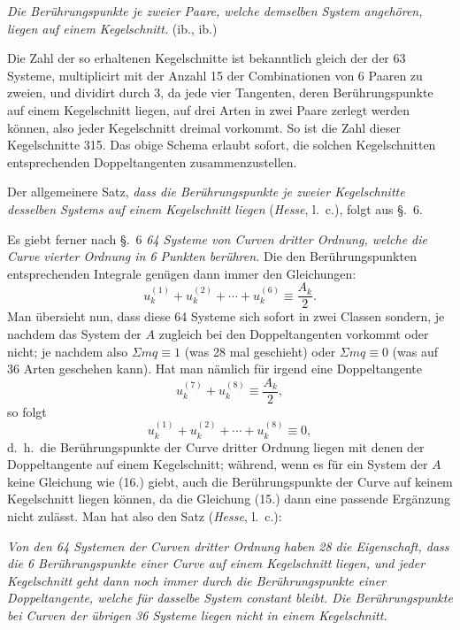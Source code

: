 \documentclass{article}
\begin{document}

\emph{Die Berührungspunkte je zweier Paare, welche demselben System angehören, liegen auf einem Kegelschnitt.} (ib., ib.)

Die Zahl der so erhaltenen Kegelschnitte ist bekanntlich gleich der der 63 Systeme, multiplicirt mit der Anzahl 15 der Combinationen von 6 Paaren zu zweien, und dividirt durch 3, da jede vier Tangenten, deren Berührungspunkte auf einem Kegelschnitt liegen, auf drei Arten in zwei Paare zerlegt werden können, also jeder Kegelschnitt dreimal vorkommt. So ist die Zahl dieser Kegelschnitte 315. Das obige Schema erlaubt sofort, die solchen Kegelschnitten entsprechenden Doppeltangenten zusammenzustellen.

Der allgemeinere Satz, \emph{dass die Berührungspunkte je zweier Kegelschnitte desselben Systems auf einem Kegelschnitt liegen} (\emph{Hesse}, l.\ c.), folgt aus §.~6.

Es giebt ferner nach §.~6 \emph{64 Systeme von Curven dritter Ordnung, welche die Curve vierter Ordnung in 6 Punkten berühren.} Die den Berührungspunkten entsprechenden Integrale genügen dann immer den Gleichungen:
\[
u_{k}^{(1)}+u_{k}^{(2)}+\cdots+u_{k}^{(6)} \equiv \frac{A_{k}}{2}. \tag{15.}
\]
Man übersieht nun, dass diese 64 Systeme sich sofort in zwei Classen sondern, je nachdem das System der $A$ zugleich bei den Doppeltangenten vorkommt oder nicht; je nachdem also $\Sigma mq \equiv 1$ (was 28 mal geschieht) oder $\Sigma mq \equiv 0$ (was auf 36 Arten geschehen kann). Hat man nämlich für irgend eine Doppeltangente
\[
u_{k}^{(7)}+u_{k}^{(8)} \equiv \frac{A_{k}}{2}, \tag{16.}
\]
so folgt
\[
u_{k}^{(1)}+u_{k}^{(2)}+\cdots+u_{k}^{(8)} \equiv 0,
\]
d.\ h.\ die Berührungspunkte der Curve dritter Ordnung liegen mit denen der Doppeltangente auf einem Kegelschnitt; während, wenn es für ein System der $A$ keine Gleichung wie (16.) giebt, auch die Berührungspunkte der Curve auf keinem Kegelschnitt liegen können, da die Gleichung (15.) dann eine passende Ergänzung nicht zulässt. Man hat also den Satz (\emph{Hesse}, l.\ c.):

\emph{Von den 64 Systemen der Curven dritter Ordnung haben 28 die Eigenschaft, dass die 6 Berührungspunkte einer Curve auf einem Kegelschnitt liegen, und jeder Kegelschnitt geht dann noch immer durch die Berührungspunkte einer Doppeltangente, welche für dasselbe System constant bleibt. Die Berührungspunkte bei Curven der übrigen 36 Systeme liegen nicht in einem Kegelschnitt.}

\end{document}
